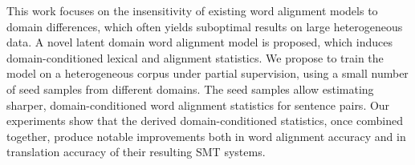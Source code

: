 This work focuses on the insensitivity of existing word alignment models to domain differences, which often yields suboptimal results on large heterogeneous data. A novel latent domain word alignment model is proposed, which induces domain-conditioned lexical and alignment statistics. We propose to train the model on a heterogeneous corpus  under partial supervision, using a small number of seed samples from different domains. The seed samples allow estimating sharper, domain-conditioned word alignment statistics for sentence pairs. Our experiments show that the derived domain-conditioned statistics, once combined together, produce notable improvements both in word alignment accuracy and in translation accuracy of their resulting SMT systems.
